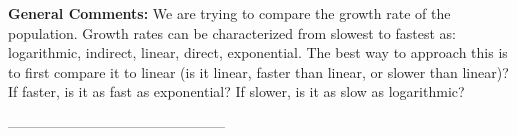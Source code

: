 \documentclass{extbook}[14pt]
\begin{document}
\textbf{General Comments:} We are trying to compare the growth rate of the population. Growth rates can be characterized from slowest to fastest as: logarithmic, indirect, linear, direct, exponential. The best way to approach this is to first compare it to linear (is it linear, faster than linear, or slower than linear)? If faster, is it as fast as exponential? If slower, is it as slow as logarithmic?

-----------------------------------------------
\end{document}
